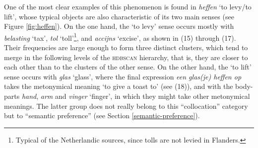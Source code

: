 \documentclass[
]{book}
\begin{document}
One of the most clear examples of this phenomenon is found in \emph{heffen} `to levy/to lift', whose typical objects are also characteristic of its two main senses (see Figure \ref{fig:heffen}). On the one hand, the `to levy' sense occurs mostly with \emph{belasting} `tax', \emph{tol} `toll'\footnote{Typical of the Netherlandic sources, since tolls are not levied in Flanders.}, and \emph{accijns} `excise', as shown in (15) through (17). Their frequencies are large enough to form three distinct clusters, which tend to merge in the following levels of the \textsc{hdbscan} hierarchy, that is, they are closer to each other than to the clusters of the other sense. On the other hand, the `to lift' sense occurs with \emph{glas} `glass', where the final expression \emph{een glas(je) heffen op} takes the metonymical meaning `to give a toast to' (see (18)), and with the body-parts \emph{hand}, \emph{arm} and \emph{vinger} `finger', in which they might take other metonymical meanings. The latter group does not really belong to this ``collocation'' category but to ``semantic preference'' (see Section \ref{semantic-preference}).
\end{document}
